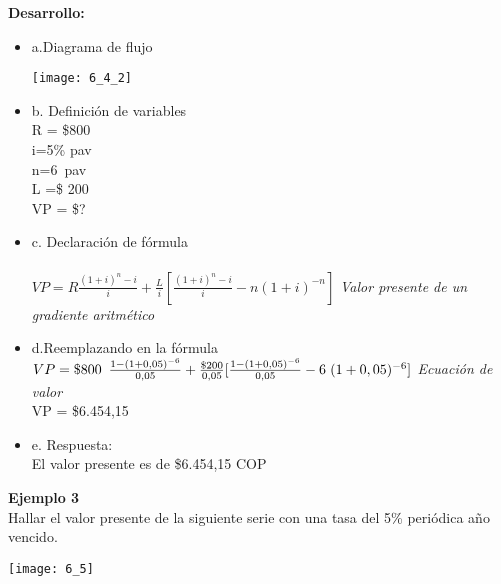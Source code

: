 	\textbf{Desarrollo:}
	\begin{itemize}
		\item a.Diagrama de flujo\\
		\begin{center}
			\texttt{[image: 6\_4\_2]}
		\end{center}
		\item b. Definición de variables\\		
			R = \$800\\
			i=5\% pav\\
			n=6\ pav\\		
			L =\$ 200\\			
			VP = \$?\\
		\item c. Declaración de fórmula\\\\
		$VP=R\frac{(1+i)^n-i}{i}+\frac{L}{i}[\frac{(1+i)^n-i}{i}-n(1+i)^{-n}]$ \hspace{35 pt} \textit{Valor presente de un gradiente aritmético}\\
		\item d.Reemplazando en la fórmula\\
		$VP=\$800\hspace{5 pt} \frac{1-(1+0,05)^{-6}}{0,05}+\frac{\$200}{0,05}[\frac{1-(1+0,05)^{-6}}{0,05}-6 \hspace{3 pt}(1+0,05)^{-6}]$ \hspace{35 pt} \textit{Ecuación de valor}\\
		VP =  \$6.454,15\\
		\item e. Respuesta:\\
		El valor presente es de \$6.454,15 COP\\
	\end{itemize}
	
	\textbf{Ejemplo 3}\\
	Hallar el valor presente de la siguiente serie con una tasa del 5\% periódica año vencido.\\
	
	\begin{center}
		\texttt{[image: 6\_5]}
	\end{center}
	
